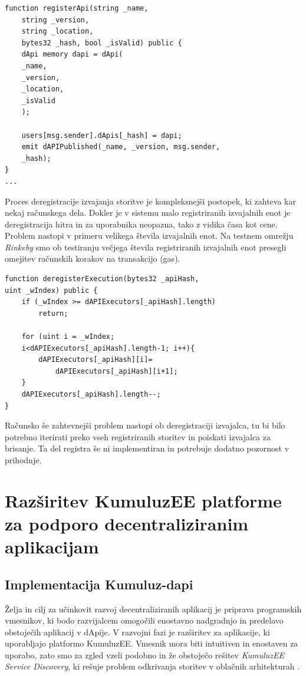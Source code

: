 \documentclass[a4paper, 12pt]{book}
\begin{document}
\begin{lstlisting}
function registerApi(string _name,
	string _version,
	string _location,
	bytes32 _hash, bool _isValid) public {
	dApi memory dapi = dApi(
	_name,
	_version,
	_location,
	_isValid
	);
	
	users[msg.sender].dApis[_hash] = dapi;
	emit dAPIPublished(_name, _version, msg.sender,
	_hash);
}
...
\end{lstlisting}

Proces deregistracije izvajanja storitve je kompleksnejši postopek, ki zahteva kar nekaj računskega dela.
Dokler je v sistemu malo registriranih izvajalnih enot je deregistracija hitra in za uporabnika neopazna, tako z vidika časa kot cene.
Problem nastopi v primeru velikega števila izvajalnih enot.
Na testnem omrežju \textit{Rinkeby} smo ob testiranju večjega števila registriranih izvajalnih enot presegli omejitev računskih korakov na transakcijo (gas).

\begin{lstlisting}
function deregisterExecution(bytes32 _apiHash, 
uint _wIndex) public {
	if (_wIndex >= dAPIExecutors[_apiHash].length)
		return;
	
	for (uint i = _wIndex;
	i<dAPIExecutors[_apiHash].length-1; i++){
		dAPIExecutors[_apiHash][i]=
			dAPIExecutors[_apiHash][i+1];
	}
	dAPIExecutors[_apiHash].length--;
}
\end{lstlisting}

Računsko še zahtevnejši problem nastopi ob deregistraciji izvajalca, tu bi bilo potrebno iterirati preko vseh registriranih storitev in poiskati izvajalca za brisanje.
Ta del registra še ni implementiran in potrebuje dodatno pozornost v prihodnje.


\section{Razširitev KumuluzEE platforme za podporo decentraliziranim aplikacijam}

\subsection{Implementacija Kumuluz-dapi}
Želja in cilj za učinkovit razvoj decentraliziranih aplikacij je priprava programskih vmesnikov, ki bodo razvijalcem omogočili enostavno nadgradnjo in predelavo obstoječih aplikacij v dApije.
V razvojni fazi je razširitev za aplikacije, ki uporabljajo platformo KumuluzEE.
Vmesnik mora biti intuitiven in enostaven za uporabo, zato smo za zgled vzeli podobno in že obstoječo rešitev \textit{KumuluzEE Service Discovery}, ki rešuje problem odkrivanja storitev v oblačnih arhitekturah \cite{maldip}.
\end{document}
